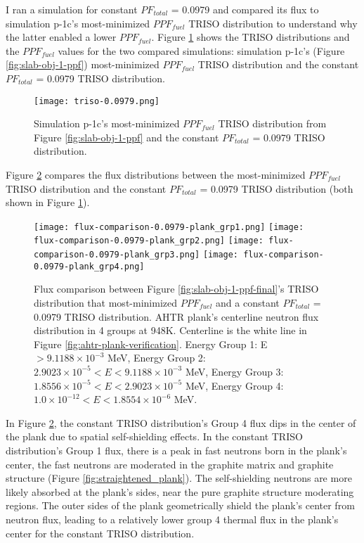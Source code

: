 I ran a simulation for constant $PF_{total}$ = 0.0979 and compared its 
flux to simulation p-1c's most-minimized $PPF_{fuel}$ TRISO distribution to understand 
why the latter enabled a lower $PPF_{fuel}$. 
Figure \ref{fig:triso-0.0979} shows the TRISO distributions and the $PPF_{fuel}$ 
values for the two compared simulations: simulation p-1c's (Figure 
\ref{fig:slab-obj-1-ppf}) most-minimized $PPF_{fuel}$ TRISO distribution and 
the constant $PF_{total}$ = 0.0979 TRISO distribution. 
\begin{figure}[htbp!]
    \centering
    \texttt{[image: triso-0.0979.png]} 
    \caption{Simulation p-1c's most-minimized $PPF_{fuel}$ TRISO distribution 
    from Figure \ref{fig:slab-obj-1-ppf} and the constant $PF_{total}$ = 0.0979 
    TRISO distribution.}
    \label{fig:triso-0.0979}
\end{figure}

Figure \ref{fig:flux-comparison-0.0979-plank} compares the flux distributions between 
the most-minimized $PPF_{fuel}$ TRISO distribution and the constant $PF_{total}$ = 0.0979 
TRISO distribution (both shown in Figure \ref{fig:triso-0.0979}).
\begin{figure}[htbp!]
    \centering
    \texttt{[image: flux-comparison-0.0979-plank\_grp1.png]} 
    \texttt{[image: flux-comparison-0.0979-plank\_grp2.png]} 
    \texttt{[image: flux-comparison-0.0979-plank\_grp3.png]} 
    \texttt{[image: flux-comparison-0.0979-plank\_grp4.png]} 
    \caption{Flux comparison between Figure \ref{fig:slab-obj-1-ppf-final}'s TRISO 
    distribution that most-minimized $PPF_{fuel}$ and a constant $PF_{total}$ = 0.0979 
    TRISO distribution. 
    \gls{AHTR} plank's centerline neutron flux distribution in 4 groups at 948K. 
    Centerline is the white line in Figure \ref{fig:ahtr-plank-verification}.
    Energy Group 1: E $> 9.1188 \times 10^{-3}$ MeV, 
    Energy Group 2: $2.9023 \times 10^{-5} < E < 9.1188 \times 10^{-3}$ MeV,
    Energy Group 3:  $1.8556 \times 10^{-5} < E < 2.9023 \times 10^{-5}$ MeV,
    Energy Group 4:  $1.0 \times 10^{-12} < E < 1.8554 \times 10^{-6}$ MeV.}
    \label{fig:flux-comparison-0.0979-plank}
\end{figure}

In Figure \ref{fig:flux-comparison-0.0979-plank}, the constant TRISO distribution's 
Group 4 flux dips in the center of the plank due to spatial self-shielding effects. 
In the constant TRISO distribution's Group 1 flux, there is a peak in fast neutrons
born in the plank's center, the fast neutrons are moderated in the graphite matrix 
and graphite structure (Figure \ref{fig:straightened_plank}). 
The self-shielding neutrons are more likely absorbed at the plank's sides, near 
the pure graphite structure moderating regions. 
The outer sides of the plank geometrically shield the plank's center from neutron 
flux, leading to a relatively lower group 4 thermal flux in the plank's center for 
the constant TRISO distribution. 

